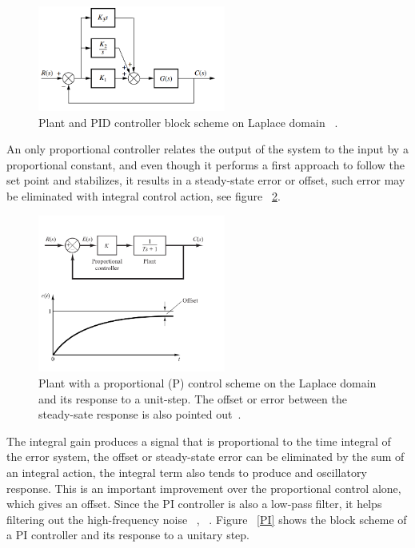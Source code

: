 \begin{figure}[h]
	\centering
	\includegraphics[width=0.55\textwidth]{Chp2/PID_scheme.png}
	\caption{ Plant and PID controller block scheme on Laplace domain ~\cite[Chapter~ 9]{Nise}. \label{PID_scheme}}
\end{figure}

 An only  proportional controller   relates the output of the system to the input by a proportional constant, and even though it performs a first approach to follow the  set point and stabilizes,  it results in a steady-state error or offset, such error may be eliminated with integral control action, see figure ~\ref{propGain}.
\smallskip

\begin{figure}[h]
	\centering
		\includegraphics[width=0.55\textwidth]{Chp2/propgain.png}
	\caption{ Plant with a proportional (P) control  scheme on the Laplace domain and its response to a unit-step. The offset or error between the steady-sate response is also pointed out~\cite[Chapter~ 5]{Ogata2009}. \label{propGain}}
\end{figure}


The integral gain produces a signal that is proportional to the time integral of the error system, the offset or steady-state error can be eliminated by the sum of an integral action, the integral term also tends to produce and oscillatory response. This is an  important improvement over the proportional control alone, which gives an offset. Since the PI controller is also a low-pass filter, it helps filtering out the high-frequency noise  ~\cite[Chapter ~9]{Golnaraghi2010}, ~\cite[Chapter~ 5]{Ogata2009}. Figure ~\ref{PI} shows the block scheme of a PI controller and its response to a unitary step.
\smallskip

